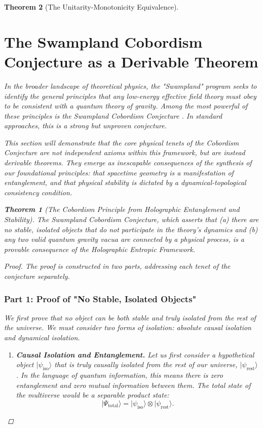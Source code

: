 \documentclass[11pt, letterpaper]{report}
\theoremstyle{plain} %
\newtheorem{theorem}{Theorem}[chapter]
\theoremstyle{definition} %
\theoremstyle{remark} %
\begin{document}
\begin{theorem}[The Unitarity-Monotonicity Equivalence]
\section{The Swampland Cobordism Conjecture as a Derivable Theorem}
\label{sec:scc_derivation}

In the broader landscape of theoretical physics, the "Swampland" program seeks to identify the general principles that any low-energy effective field theory must obey to be consistent with a quantum theory of gravity. Among the most powerful of these principles is the Swampland Cobordism Conjecture \cite{McNamara2019Cobordism}. In standard approaches, this is a strong but unproven conjecture.

This section will demonstrate that the core physical tenets of the Cobordism Conjecture are not independent axioms within this framework, but are instead derivable theorems. They emerge as inescapable consequences of the synthesis of our foundational principles: that spacetime geometry is a manifestation of entanglement, and that physical stability is dictated by a dynamical-topological consistency condition.

\begin{theorem}[The Cobordism Principle from Holographic Entanglement and Stability]
\label{thm:scc_is_theorem}
The Swampland Cobordism Conjecture, which asserts that (a) there are no stable, isolated objects that do not participate in the theory's dynamics and (b) any two valid quantum gravity vacua are connected by a physical process, is a provable consequence of the Holographic Entropic Framework.
\end{theorem}
\begin{proof}
The proof is constructed in two parts, addressing each tenet of the conjecture separately.

\subsubsection*{Part 1: Proof of "No Stable, Isolated Objects"}

We first prove that no object can be both stable and truly isolated from the rest of the universe. We must consider two forms of isolation: absolute causal isolation and dynamical isolation.

\begin{enumerate}
    \item \textbf{Causal Isolation and Entanglement.} Let us first consider a hypothetical object $|\psi_{\text{iso}}\rangle$ that is truly causally isolated from the rest of our universe, $|\psi_{\text{rest}}\rangle$. In the language of quantum information, this means there is zero entanglement and zero mutual information between them. The total state of the multiverse would be a separable product state:
    \begin{equation}
        |\Psi_{\text{total}}\rangle = |\psi_{\text{iso}}\rangle \otimes |\psi_{\text{rest}}\rangle.
    \end{equation}


\end{enumerate}
\end{proof}
\end{theorem}
\end{document}
